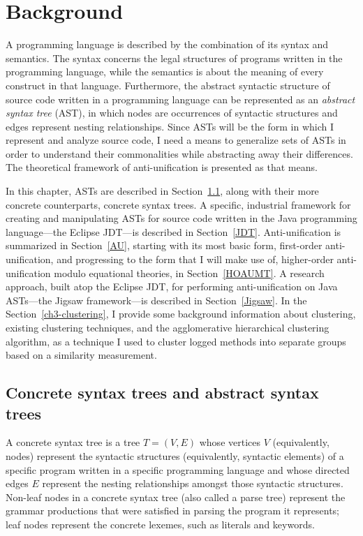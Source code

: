 \chapter{Background}  \label{background}
A programming language is described by the combination of its syntax and semantics. The syntax concerns the legal structures of programs written in the programming language, while the semantics is about the meaning of every construct in that language. Furthermore, the abstract syntactic structure of source code written in a programming language can be represented as an \emph{abstract syntax tree} (AST), in which nodes are occurrences of syntactic structures and edges represent nesting relationships. Since ASTs will be the form in which I represent and analyze source code, I need a means to generalize sets of ASTs in order to understand their commonalities while abstracting away their differences. The theoretical framework of anti-unification is presented as that means.

In this chapter, ASTs are described in Section~\ref{AST}, along with their more concrete counterparts, concrete syntax trees. A specific, industrial framework for creating and manipulating ASTs for source code written in the Java programming language---the Eclipse JDT---is described in Section~\ref{JDT}.  Anti-unification is summarized in Section~\ref{AU}, starting with its most basic form, first-order anti-unification, and progressing to the form that I will make use of, higher-order anti-unification modulo equational theories, in Section~\ref{HOAUMT}.  A research approach, built atop the Eclipse JDT, for performing anti-unification on Java ASTs---the Jigsaw framework---is described in Section~\ref{Jigsaw}. In the Section~\ref{ch3-clustering}, I provide some background information about clustering, existing clustering techniques, and the agglomerative hierarchical clustering algorithm, as a technique I used to cluster logged methods into separate groups based on a similarity measurement.

\section{Concrete syntax trees and abstract syntax trees}\label{AST}

A concrete syntax tree is a tree $T=(V,E)$ whose vertices $V$ (equivalently, nodes) represent the syntactic structures (equivalently, syntactic elements) of a specific program written in a specific programming language and whose directed edges $E$ represent the nesting relationships amongst those syntactic structures.  Non-leaf nodes in a concrete syntax tree (also called a parse tree) represent the grammar productions that were satisfied in parsing the program it represents; leaf nodes represent the concrete lexemes, such as literals and keywords.

